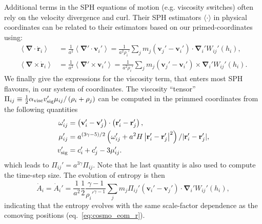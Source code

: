 Additional terms in the SPH equations of motion (e.g. viscosity
switches) often rely on the velocity divergence and curl. Their SPH
estimators $\langle\cdot\rangle$ in physical coordinates can be
related to their estimators based on our primed-coordinates using:
\begin{align}
  \left\langle \mathbf{\nabla}\cdot\dot{\mathbf{r}}_i \right\rangle &=
  \frac{1}{a^2} \left\langle
  \mathbf{\nabla}'\cdot\mathbf{v}_i'\right\rangle =
  \frac{1}{a^2\rho_i'}\sum_j m_j\left(\mathbf{v}_j' -
  \mathbf{v}_i'\right) \cdot \mathbf{\nabla}_i'W_{ij}'(h_i), \nonumber \\
  \left\langle \mathbf{\nabla}\times\dot{\mathbf{r}}_i \right\rangle &=
  \frac{1}{a^2} \left\langle
  \mathbf{\nabla}'\times\mathbf{v}_i'\right\rangle =
  \frac{1}{a^2\rho_i'}\sum_j m_j\left(\mathbf{v}_j' -
  \mathbf{v}_i'\right) \times \mathbf{\nabla}_i'W_{ij}'(h_i). \nonumber
\end{align}
We finally give the expressions for the \cite{Monaghan1997} viscosity
term, that enters most SPH flavours, in our system of coordinates. The
viscosity ``tensor'' $\Pi_{ij} \equiv \frac{1}{2}\alpha_{\rm visc} v_{\rm
    sig}'\mu_{ij}/\left(\rho_i + \rho_j\right)$ can be computed
  in the primmed coordinates from the following quantities
\begin{align}
  \omega_{ij}' &= \left(\mathbf{v}_i' - \mathbf{v}_j'\right) \cdot
  \left(\mathbf{r}_i' - \mathbf{r}_j'\right), \\
  \mu_{ij}' &=
  a^{(3\gamma-5)/2} \left(\omega_{ij}' + a^2H\left|\mathbf{r}_i' -
  \mathbf{r}_j'\right|^2 \right) / |\mathbf{r}_i' - \mathbf{r}_j' |,
  \\
  v_{\rm sig}' &= c_i' + c_j' - 3 \mu_{ij}'.
\end{align}
which leads to $\Pi_{ij}'=a^{3\gamma}\Pi_{ij}$. Note that he last quantity is
also used to compute the time-step size. The evolution of entropy is
then
\begin{equation}
  \dot{A}_i = \dot{A}_i' = \frac{1}{a^2}\frac{1}{2}\frac{\gamma-1}{\rho_i'^{\gamma-1}} \sum_j
  m_j \Pi_{ij}' \left(\mathbf{v}_i' -
  \mathbf{v}_j'\right)\cdot\mathbf{\nabla}_i'W_{ij}'(h_i),
\end{equation}
indicating that the entropy evolves with the same scale-factor
dependence as the comoving positions (eq.~\ref{eq:cosmo_eom_r}).


